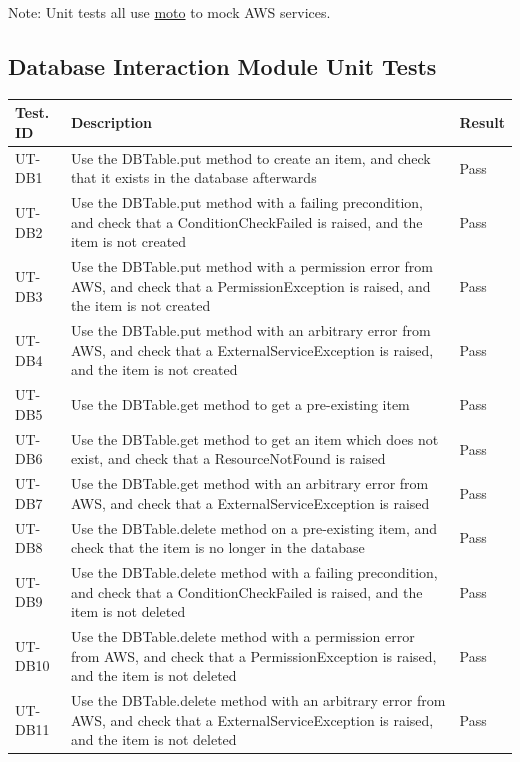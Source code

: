 \documentclass[12pt, titlepage]{article}
\begin{document}
Note: Unit tests all use \href{https://pypi.org/project/moto/}{moto}
to mock AWS services.

\subsection{Database Interaction Module Unit Tests}

\begin{longtable}{|m{2cm}|m{10cm}|m{1.4cm}|}
  \hline
  \textbf{Test. ID} & \textbf{Description} & \textbf{Result} \\ \hline
  UT-DB1 & Use the DBTable.put method to create an item, and check
  that it exists in the database afterwards & Pass\\ \hline
  UT-DB2 & Use the DBTable.put method with a failing precondition,
  and check that a ConditionCheckFailed is raised, and the item is
  not created & Pass\\ \hline
  UT-DB3 & Use the DBTable.put method with a permission error from
  AWS, and check that a PermissionException is raised, and the item
  is not created & Pass\\ \hline
  UT-DB4 & Use the DBTable.put method with an arbitrary error from
  AWS, and check that a ExternalServiceException is raised, and the
  item is not created & Pass\\ \hline
  UT-DB5 & Use the DBTable.get method to get a pre-existing item &
  Pass\\ \hline
  UT-DB6 & Use the DBTable.get method to get an item which does not
  exist, and check that a ResourceNotFound is raised & Pass\\ \hline
  UT-DB7 & Use the DBTable.get method with an arbitrary error from
  AWS, and check that a ExternalServiceException is raised & Pass\\ \hline
  UT-DB8 & Use the DBTable.delete method on a pre-existing item, and
  check that the item is no longer in the database & Pass\\ \hline
  UT-DB9 & Use the DBTable.delete method with a failing
  precondition, and check that a ConditionCheckFailed is raised, and
  the item is not deleted & Pass\\ \hline
  UT-DB10 & Use the DBTable.delete method with a permission error
  from AWS, and check that a PermissionException is raised, and the
  item is not deleted & Pass\\ \hline
  UT-DB11 & Use the DBTable.delete method with an arbitrary error
  from AWS, and check that a ExternalServiceException is raised, and
  the item is not deleted & Pass\\ \hline

\end{longtable}
\end{document}

